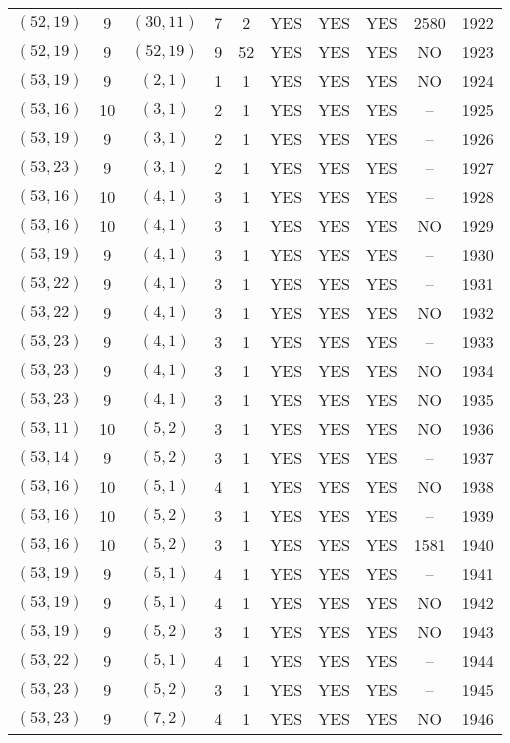\begin{longtable}{|c|c|c|c|c|c|c|c|c|c|}
$(52, 19)$ & 9 & $(30, 11)$ & 7 & 2 & YES & YES & YES & 2580 & 1922\\
$(52, 19)$ & 9 & $(52, 19)$ & 9 & 52 & YES & YES & YES & NO & 1923\\
$(53, 19)$ & 9 & $(2, 1)$ & 1 & 1 & YES & YES & YES & NO & 1924\\
$(53, 16)$ & 10 & $(3, 1)$ & 2 & 1 & YES & YES & YES & -- & 1925\\
$(53, 19)$ & 9 & $(3, 1)$ & 2 & 1 & YES & YES & YES & -- & 1926\\
$(53, 23)$ & 9 & $(3, 1)$ & 2 & 1 & YES & YES & YES & -- & 1927\\
$(53, 16)$ & 10 & $(4, 1)$ & 3 & 1 & YES & YES & YES & -- & 1928\\
$(53, 16)$ & 10 & $(4, 1)$ & 3 & 1 & YES & YES & YES & NO & 1929\\
$(53, 19)$ & 9 & $(4, 1)$ & 3 & 1 & YES & YES & YES & -- & 1930\\
$(53, 22)$ & 9 & $(4, 1)$ & 3 & 1 & YES & YES & YES & -- & 1931\\
$(53, 22)$ & 9 & $(4, 1)$ & 3 & 1 & YES & YES & YES & NO & 1932\\
$(53, 23)$ & 9 & $(4, 1)$ & 3 & 1 & YES & YES & YES & -- & 1933\\
$(53, 23)$ & 9 & $(4, 1)$ & 3 & 1 & YES & YES & YES & NO & 1934\\
$(53, 23)$ & 9 & $(4, 1)$ & 3 & 1 & YES & YES & YES & NO & 1935\\
$(53, 11)$ & 10 & $(5, 2)$ & 3 & 1 & YES & YES & YES & NO & 1936\\
$(53, 14)$ & 9 & $(5, 2)$ & 3 & 1 & YES & YES & YES & -- & 1937\\
$(53, 16)$ & 10 & $(5, 1)$ & 4 & 1 & YES & YES & YES & NO & 1938\\
$(53, 16)$ & 10 & $(5, 2)$ & 3 & 1 & YES & YES & YES & -- & 1939\\
$(53, 16)$ & 10 & $(5, 2)$ & 3 & 1 & YES & YES & YES & 1581 & 1940\\
$(53, 19)$ & 9 & $(5, 1)$ & 4 & 1 & YES & YES & YES & -- & 1941\\
$(53, 19)$ & 9 & $(5, 1)$ & 4 & 1 & YES & YES & YES & NO & 1942\\
$(53, 19)$ & 9 & $(5, 2)$ & 3 & 1 & YES & YES & YES & NO & 1943\\
$(53, 22)$ & 9 & $(5, 1)$ & 4 & 1 & YES & YES & YES & -- & 1944\\
$(53, 23)$ & 9 & $(5, 2)$ & 3 & 1 & YES & YES & YES & -- & 1945\\
$(53, 23)$ & 9 & $(7, 2)$ & 4 & 1 & YES & YES & YES & NO & 1946\\

\end{longtable}
